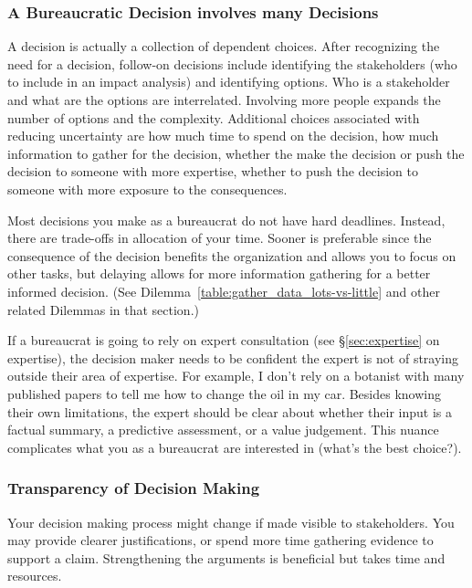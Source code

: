 

\subsubsection{A Bureaucratic Decision involves many Decisions}

A decision is actually a collection of dependent choices. After recognizing the need for a decision, follow-on decisions include identifying the stakeholders (who to include in an impact analysis) and identifying options. Who is a stakeholder and what are the options are interrelated. Involving more people expands the number of options and the complexity. Additional choices associated with reducing uncertainty are how much time to spend on the decision, how much information to gather for the decision, whether the make the decision or push the decision to someone with more expertise, whether to push the decision to someone with more exposure to the consequences.

Most decisions you make as a bureaucrat do not have hard deadlines. Instead, there are trade-offs in allocation of your time. Sooner is preferable since the consequence of the decision benefits the organization and allows you to focus on other tasks, but delaying allows for more information gathering for a better informed decision. (See Dilemma~\ref{table:gather_data_lots-vs-little} and other related Dilemmas in that section.)


If a bureaucrat is going to rely on expert consultation (see \S\ref{sec:expertise} on expertise), the decision maker needs to be confident the expert is not of straying outside their area of expertise. For example, I don't rely on a botanist with many published papers to tell me how to change the oil in my car. 
Besides knowing their own limitations, the expert should be clear about whether their input is a factual summary, a predictive assessment, or a value judgement. This nuance complicates what you as a bureaucrat are interested in (what's the best choice?).


\subsubsection{Transparency of Decision Making\label{sec:transparency-of-decisions}}

Your decision making process might change if made visible to stakeholders. You may provide clearer justifications, or spend more time gathering evidence to support a claim. Strengthening the arguments is beneficial but takes time and resources. 

